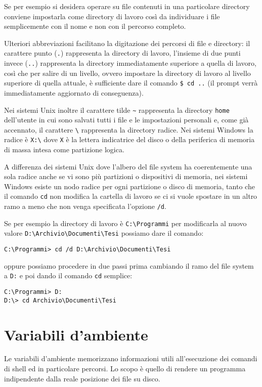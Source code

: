 Se per esempio si desidera operare su file contenuti in una particolare
directory conviene impostarla come directory di lavoro così da individuare i
file semplicemente con il nome e non con il percorso completo.

Ulteriori abbreviazioni facilitano la digitazione dei percorsi di file e
directory: il carattere punto (\texttt{.}) rappresenta la directory di lavoro,
l'insieme di due punti invece (\texttt{..}) rappresenta la directory
immediatamente superiore a quella di lavoro, così che per salire di un livello,
ovvero impostare la directory di lavoro al livello superiore di quella attuale,
è sufficiente dare il comando \texttt{\$ cd ..} (il prompt verrà immediatamente
aggiornato di conseguenza).

Nei sistemi Unix inoltre il carattere tilde \verb=~= rappresenta la directory
\texttt{home} dell'utente in cui sono salvati tutti i file e le impostazioni
personali e, come già accennato, il carattere \verb=\= rappresenta la directory
radice. Nei sistemi Windows la radice è \texttt{X:\textbackslash} dove
\texttt{X} è la lettera indicatrice del disco o della periferica di memoria di
massa intesa come partizione logica.

A differenza dei sistemi Unix dove l'albero del file system ha coerentemente una
sola radice anche se vi sono più partizioni o dispositivi di memoria, nei
sistemi Windows esiste un nodo radice per ogni partizione o disco di memoria,
tanto che il comando \texttt{cd} non modifica la cartella di lavoro se ci si
vuole spostare in un altro ramo a meno che non venga specificata l'opzione
\texttt{/d}.

Se per esempio la directory di lavoro è \verb=C:\Programmi= per modificarla al
nuovo valore \verb=D:\Archivio\Documenti\Tesi= possiamo dare il comando:
\begin{verbatim}
C:\Programmi> cd /d D:\Archivio\Documenti\Tesi
\end{verbatim}
oppure possiamo procedere in due passi prima cambiando il ramo del file system a
\verb=D:= e poi dando il comando \texttt{cd} semplice:
\begin{verbatim}
C:\Programmi> D:
D:\> cd Archivio\Documenti\Tesi
\end{verbatim}

\section{Variabili d'ambiente}

Le variabili d'ambiente memorizzano informazioni utili all'esecuzione dei
comandi di shell ed in particolare percorsi. Lo scopo è quello di rendere un
programma indipendente dalla reale posizione dei file su disco.

